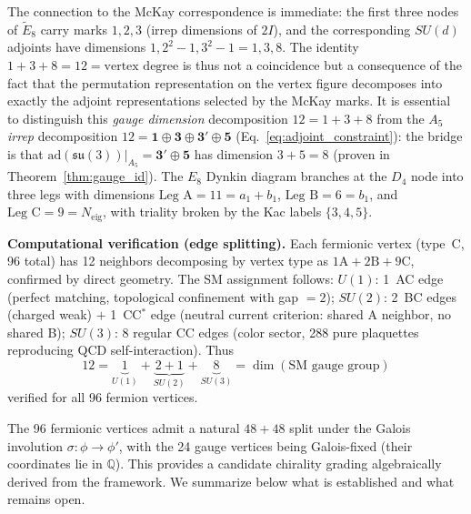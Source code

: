 \documentclass[12pt,a4paper]{article}
\theoremstyle{definition}
\begin{document}
The connection to the McKay correspondence is immediate: the first three nodes of $\widetilde{E}_8$ carry marks $1, 2, 3$ (irrep dimensions of $2I$), and the corresponding $SU(d)$ adjoints have dimensions $1, 2^2-1, 3^2-1 = 1, 3, 8$.  The identity $1 + 3 + 8 = 12 = \text{vertex degree}$ is thus not a coincidence but a consequence of the fact that the permutation representation on the vertex figure decomposes into exactly the adjoint representations selected by the McKay marks.  It is essential to distinguish this \emph{gauge dimension} decomposition $12 = 1 + 3 + 8$ from the \emph{$A_5$ irrep} decomposition $12 = \mathbf{1} \oplus \mathbf{3} \oplus \mathbf{3'} \oplus \mathbf{5}$ (Eq.~\ref{eq:adjoint_constraint}): the bridge is that $\mathrm{ad}(\mathfrak{su}(3))|_{A_5} = \mathbf{3'} \oplus \mathbf{5}$ has dimension $3 + 5 = 8$ (proven in Theorem~\ref{thm:gauge_id}).  The $E_8$ Dynkin diagram branches at the $D_4$ node into three legs with dimensions $\text{Leg A} = 11 = a_1 + b_1$, $\text{Leg B} = 6 = b_1$, and $\text{Leg C} = 9 = N_{\text{eig}}$, with triality broken by the Kac labels $\{3, 4, 5\}$.

\textbf{Computational verification (edge splitting).}  Each fermionic vertex (type~C, 96 total) has 12 neighbors decomposing by vertex type as $1\text{A} + 2\text{B} + 9\text{C}$, confirmed by direct geometry. The SM assignment follows: $U(1)$: 1~AC edge (perfect matching, topological confinement with gap $= 2$); $SU(2)$: 2~BC edges (charged weak) $+$ 1~CC$^*$ edge (neutral current criterion: shared A neighbor, no shared B); $SU(3)$: 8 regular CC edges (color sector, 288 pure plaquettes reproducing QCD self-interaction).  Thus
\begin{equation}
12 = \underbrace{1}_{U(1)} + \underbrace{2 + 1}_{SU(2)} + \underbrace{8}_{SU(3)} = \dim(\text{SM gauge group})
\end{equation}
verified for all 96 fermion vertices.

The 96 fermionic vertices admit a natural $48+48$ split under the Galois involution $\sigma\!: \phi \to \phi'$, with the 24 gauge vertices being Galois-fixed (their coordinates lie in $\mathbb{Q}$).  This provides a candidate chirality grading algebraically derived from the framework.  We summarize below what is established and what remains open.
\end{document}
